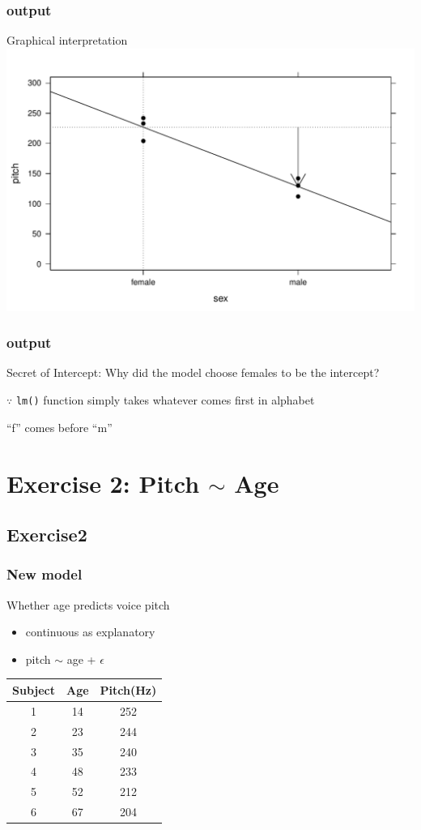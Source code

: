 \documentclass{beamer}\usepackage[]{graphicx}\usepackage[]{color}
\makeatletter
\def\maxwidth{ %
  \ifdim\Gin@nat@width>\linewidth
    \linewidth
  \else
    \Gin@nat@width
  \fi
}
\newenvironment{knitrout}{}{} %
\makeatother
\begin{document}
\begin{frame}[fragile]
\frametitle{output}
Graphical interpretation
\begin{knitrout}
\color{fgcolor}
\includegraphics[width=\maxwidth]{figure/unnamed-chunk-9-1} 

\end{knitrout}
\end{frame}
\begin{frame}
\frametitle{output}
Secret of Intercept: Why did the model choose females to be the intercept?
\pause

\vspace{9pt}
$\because$ \texttt{lm()} function simply takes whatever comes first in \alert{alphabet} 

``f'' comes before ``m''

\end{frame}

\section[Exercise2]{Exercise 2: Pitch $\sim$ Age}
\subsection[Ex2]{Exercise2}

\begin{frame}[fragile]
\frametitle{New model}
Whether age predicts voice pitch
\begin{itemize}
\item continuous as explanatory 
\item pitch $\sim$ age + $\epsilon$
\end{itemize}
\begin{center}
\begin{tabular}{ccc}
\toprule
Subject & Age & Pitch(Hz) \\
\midrule
1 & 14 & 252 \\
2 & 23 & 244 \\
3 & 35 & 240 \\
4 & 48 & 233 \\
5 & 52 & 212 \\
6 & 67 & 204 \\
\bottomrule
\end{tabular}
\end{center}
\end{frame}
\end{document}
